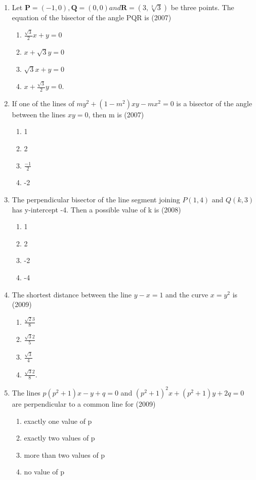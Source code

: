 \documentclass[12pt]{article}
\let\vec\mathbf
\begin{document}
\begin{enumerate}
\begin{enumerate}
\end{enumerate}
\item Let $\vec{P}=(-1,0),\vec{Q}=(0,0) and \vec{R}=(3,\sqrt[3]{3})$ be three points. The equation of the bisector of the angle PQR is (2007)
\begin{enumerate}
\item $\frac{\sqrt{3}}{2}x+y=0$ 
\item $x+\sqrt{3}y=0$ 
\item $\sqrt{3}x+y=0$ 
\item $x+\frac{\sqrt{3}}{2}y=0$.
\end{enumerate}
\item If one of the lines of $my^2+(1-m^2)xy-mx^2=0$ is a bisector of the angle between the lines $xy=0$, then m is (2007)
\begin{enumerate}
\item 1  
\item 2 
\item $\frac{-1}{2}$ 
\item -2
\end{enumerate}
\item The perpendicular bisector of the line segment joining $P(1,4)$ and $Q(k,3)$ has y-intercept -4. Then a possible value of k is (2008)
\begin{enumerate}
\item  1 
\item  2 
\item -2 
\item -4
\end{enumerate}
\item The shortest distance between the line $y-x=1$ and the curve $x=y^2$ is (2009)
\begin{enumerate}
\item $\frac{\sqrt{2}{3}}{8}$ 
\item $\frac{\sqrt{3}{2}}{5}$ 
\item $\frac{\sqrt{3}}{4}$ 
\item $\frac{\sqrt{3}{2}}{8}$.
\end{enumerate}
\item The lines $p(p^2+1)x-y+q=0$ and $(p^2+1)^2x+(p^2+1)y+2q=0$ are perpendicular to a common line for (2009)
\begin{enumerate}
\item exactly one value of p
\item exactly two values of p
\item more than two values of p
\item no value of p

\end{enumerate}
\end{enumerate}
\end{document}
